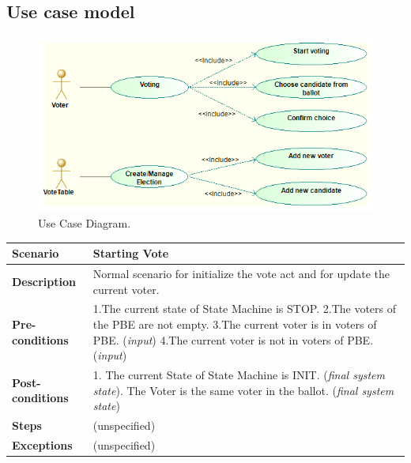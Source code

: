 \documentclass{article}
\begin{document}
\subsection{Use case model}

\begin{figure}[H]
\centering
	\includegraphics[width=\textwidth,height=\textheight,keepaspectratio]{use.png}
	\caption{Use Case Diagram.}
	\label{fig:PropProf}
\end{figure}

\begin{center}
    \begin{tabular}{ | l | p{9cm} |}
    \hline
   \textbf{Scenario}	& \textbf{Starting Vote}  \\ \hline
    \textbf{Description}	& Normal scenario for initialize the vote act and for update the current voter. \\ \hline
   \textbf{Pre-conditions}	& 1.The current state of State Machine is STOP.\linebreak
2.The voters of the PBE are not empty.\linebreak
3.The current voter is in voters of PBE. (\textit{input})\linebreak
4.The current voter is not in voters of PBE. (\textit{input})
\\ \hline
 \textbf{Post-conditions} &	1.	The current State of State Machine is INIT. (\textit{final system state})\linebreak
2.	The Voter is the same voter in the ballot. (\textit{final system state})
   \\ \hline
   \textbf{Steps} &	(unspecified) \\ 
    \hline
\textbf{Exceptions}& 	(unspecified)
 \\ 
    \hline
    \end{tabular}
\end{center}
\end{document}
